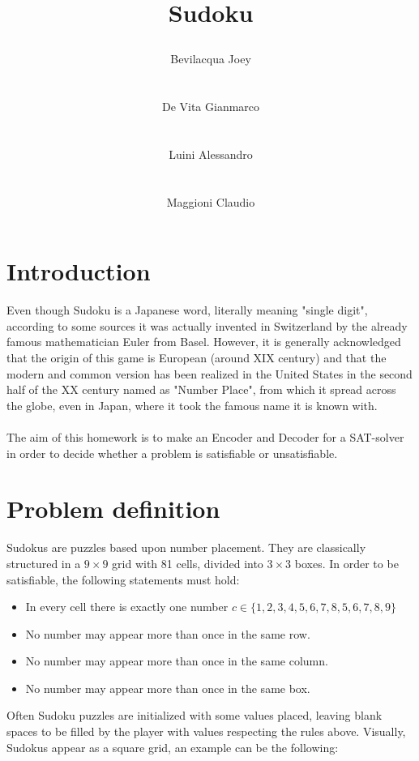 \documentclass[]{usiinfprospectus}
\author{\centerline{Bevilacqua Joey} \\[3pt] \centerline{De Vita Gianmarco}  \\[3pt] \centerline{Luini Alessandro}  \\[3pt] \centerline{Maggioni Claudio}}
\title{\centerline{Sudoku}}
\newcounter{row}
\newcounter{col}
\begin{document}
\maketitle
\tableofcontents
\newpage
\section{Introduction} \label{introduction}
Even though Sudoku is a Japanese word, literally meaning "single digit", according to some sources it was actually invented in Switzerland by the already famous mathematician Euler from Basel. However, it is generally acknowledged that the origin of this game is European (around XIX century) and that the modern and common version has been realized in the United States in the second half of the XX century named as "Number Place", from which it spread across the globe, even in Japan, where it took the famous name it is known with.\\ \\
The aim of this homework is to make an Encoder and Decoder for a SAT-solver in order to decide whether a problem is satisfiable or unsatisfiable.
\newpage
\section{Problem definition} \label{problem}
Sudokus are puzzles based upon number placement. They are classically structured in a $9\times 9$ grid with 81 cells, divided into $3\times 3$ boxes. In order to be satisfiable, the following statements must hold:
\begin{itemize}%
\item In every cell there is exactly one number $c \in \{1,2,3,4,5,6,7,8,5,6,7,8, 9 \}$
\item No number may appear more than once in the same row.
\item No number may appear more than once in the same column.
\item No number may appear more than once in the same box.
\end{itemize}
Often Sudoku puzzles are initialized with some values placed, leaving blank spaces to be filled by the player with values respecting the rules above. Visually, Sudokus appear as a square grid, an example can be the following:
\end{document}
